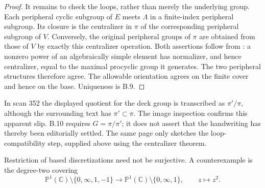 \begin{proof}
It remains to check the loops, rather than merely the underlying
group.  Each peripheral cyclic subgroup of $E$ meets $\Lambda$ in
a finite-index peripheral subgroup.  Its closure is the centralizer
in $\pi$ of the corresponding peripheral subgroup of $V$.
Conversely, the original peripheral groups of $\pi$ are obtained
from those of $V$ by exactly this centralizer operation.
Both assertions follow from
\citet[Proposition 3.6]{BoggiZalesskii2019BC}: a nonzero power of
an algebraically simple element has normalizer, and hence
centralizer, equal to the maximal procyclic group it generates.
The two peripheral structures therefore agree.  The allowable
orientation agrees on the finite cover and hence on the base.
Uniqueness is B.9.
\end{proof}

In scan 352 the displayed quotient for the deck group is transcribed
as $\pi'/\pi$, although the surrounding text has $\pi'\subset\pi$.
The image inspection confirms this apparent slip.  B.10 requires
$G=\pi/\pi'$; it does not assert that the handwriting has thereby
been editorially settled.  The same page only sketches the
loop-compatibility step, supplied above using the centralizer theorem.

Restriction of based discretizations need not be surjective.  A
counterexample is the degree-two covering
\[
 \mathbb P^1(\mathbb C)\setminus\{0,\infty,1,-1\}
 \longrightarrow
 \mathbb P^1(\mathbb C)\setminus\{0,\infty,1\},
 \qquad z\longmapsto z^2.
\]

